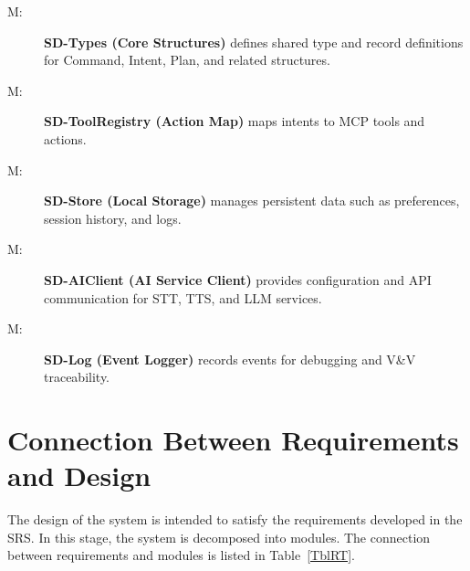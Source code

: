 \documentclass[12pt, titlepage]{article}
\newcounter{mnum}
\newcommand{\mthemnum}{M\themnum}
\begin{document}
\begin{description}
  \item [ \mthemnum \label{mSDTypes}:]
  \textbf{SD-Types (Core Structures)} defines shared type and record definitions
  for Command, Intent, Plan, and related structures.
  \item [ \mthemnum \label{mSDRegistry}:]
  \textbf{SD-ToolRegistry (Action Map)} maps intents to MCP tools and actions.
  \item [ \mthemnum \label{mSDStore}:]
  \textbf{SD-Store (Local Storage)} manages persistent data such as
  preferences, session history, and logs.
  \item [ \mthemnum \label{mSDConfig}:]
  \textbf{SD-AIClient (AI Service Client)} provides configuration and API
  communication for STT, TTS, and LLM services.
  \item [ \mthemnum \label{mSDLog}:]
  \textbf{SD-Log (Event Logger)} records events for debugging and V\&V
  traceability.

\end{description}

\section{Connection Between Requirements and Design} \label{SecConnection}

The design of the system is intended to satisfy the requirements developed in
the SRS. In this stage, the system is decomposed into modules. The connection
between requirements and modules is listed in Table~\ref{TblRT}.
\end{document}
